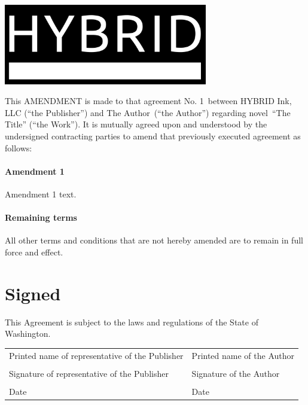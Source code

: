 \documentclass[12pt,letterpaper]{article}
\def\WorkTitle{The Title}
\def\WorkAuthor{The Author}
\def\WorkType{novel}
\def\ContractNumber{1}
\begin{document}
\begin{center}
\noindent\includegraphics[width=3.5in]{logo}
\end{center}

\vspace{0.5in}

\noindent This AMENDMENT is made to that agreement No. \ContractNumber\ between HYBRID Ink, LLC (``the Publisher'') and \WorkAuthor\ (``the Author'') regarding \WorkType\ ``\WorkTitle'' (``the Work''). It is mutually agreed upon and understood by the undersigned contracting parties to amend that previously executed agreement as follows:

\paragraph{Amendment 1}

Amendment 1 text.

\paragraph{Remaining terms}

All other terms and conditions that are not hereby amended are to remain in full force and effect.

\newpage

\thispagestyle{final}

\section*{Signed}

This Agreement is subject to the laws and regulations of the State of Washington.

\begin{tabular}{p{3in} p{3in}}
    \vspace{0.5in} & \\ \hline
    Printed name of representative of the Publisher & Printed name of the Author \\
    \vspace{0.5in} & \\ \hline
    Signature of representative of the Publisher & Signature of the Author \\
    \vspace{0.5in} & \\ \hline
    Date & Date \\
\end{tabular}
\end{document}
